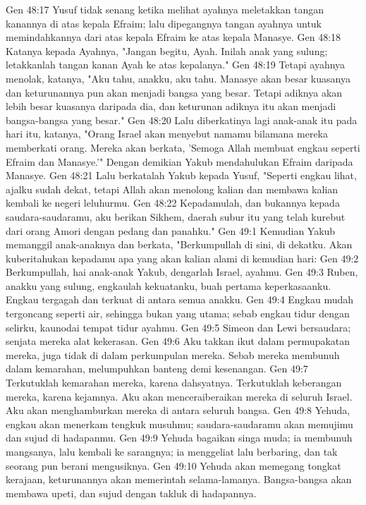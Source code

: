 Gen 48:17  Yusuf tidak senang ketika melihat ayahnya meletakkan tangan kanannya di atas kepala Efraim; lalu dipegangnya tangan ayahnya untuk memindahkannya dari atas kepala Efraim ke atas kepala Manasye.
Gen 48:18  Katanya kepada Ayahnya, "Jangan begitu, Ayah. Inilah anak yang sulung; letakkanlah tangan kanan Ayah ke atas kepalanya."
Gen 48:19  Tetapi ayahnya menolak, katanya, "Aku tahu, anakku, aku tahu. Manasye akan besar kuasanya dan keturunannya pun akan menjadi bangsa yang besar. Tetapi adiknya akan lebih besar kuasanya daripada dia, dan keturunan adiknya itu akan menjadi bangsa-bangsa yang besar."
Gen 48:20  Lalu diberkatinya lagi anak-anak itu pada hari itu, katanya, "Orang Israel akan menyebut namamu bilamana mereka memberkati orang. Mereka akan berkata, 'Semoga Allah membuat engkau seperti Efraim dan Manasye.'" Dengan demikian Yakub mendahulukan Efraim daripada Manasye.
Gen 48:21  Lalu berkatalah Yakub kepada Yusuf, "Seperti engkau lihat, ajalku sudah dekat, tetapi Allah akan menolong kalian dan membawa kalian kembali ke negeri leluhurmu.
Gen 48:22  Kepadamulah, dan bukannya kepada saudara-saudaramu, aku berikan Sikhem, daerah subur itu yang telah kurebut dari orang Amori dengan pedang dan panahku."
Gen 49:1  Kemudian Yakub memanggil anak-anaknya dan berkata, "Berkumpullah di sini, di dekatku. Akan kuberitahukan kepadamu apa yang akan kalian alami di kemudian hari:
Gen 49:2  Berkumpullah, hai anak-anak Yakub, dengarlah Israel, ayahmu.
Gen 49:3  Ruben, anakku yang sulung, engkaulah kekuatanku, buah pertama keperkasaanku. Engkau tergagah dan terkuat di antara semua anakku.
Gen 49:4  Engkau mudah tergoncang seperti air, sehingga bukan yang utama; sebab engkau tidur dengan selirku, kaunodai tempat tidur ayahmu.
Gen 49:5  Simeon dan Lewi bersaudara; senjata mereka alat kekerasan.
Gen 49:6  Aku takkan ikut dalam permupakatan mereka, juga tidak di dalam perkumpulan mereka. Sebab mereka membunuh dalam kemarahan, melumpuhkan banteng demi kesenangan.
Gen 49:7  Terkutuklah kemarahan mereka, karena dahsyatnya. Terkutuklah keberangan mereka, karena kejamnya. Aku akan menceraiberaikan mereka di seluruh Israel. Aku akan menghamburkan mereka di antara seluruh bangsa.
Gen 49:8  Yehuda, engkau akan menerkam tengkuk musuhmu; saudara-saudaramu akan memujimu dan sujud di hadapanmu.
Gen 49:9  Yehuda bagaikan singa muda; ia membunuh mangsanya, lalu kembali ke sarangnya; ia menggeliat lalu berbaring, dan tak seorang pun berani mengusiknya.
Gen 49:10  Yehuda akan memegang tongkat kerajaan, keturunannya akan memerintah selama-lamanya. Bangsa-bangsa akan membawa upeti, dan sujud dengan takluk di hadapannya.
